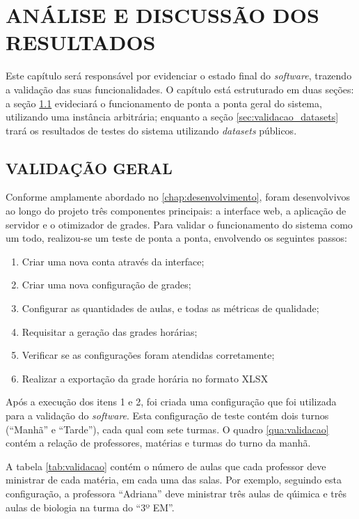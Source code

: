 
\chapter{ANÁLISE E DISCUSSÃO DOS RESULTADOS}
\label{chap:resultados}

Este capítulo será responsável por evidenciar o estado final do \textit{software}, trazendo a validação das suas funcionalidades. O capítulo está estruturado em duas seções: a seção \ref{sec:validacao_geral} evideciará o funcionamento de ponta a ponta geral do sistema, utilizando uma instância arbitrária; enquanto a seção \ref{sec:validacao_datasets} trará os resultados de testes do sistema utilizando \textit{datasets} públicos.

\section{VALIDAÇÃO GERAL}
\label{sec:validacao_geral}

Conforme amplamente abordado no \autoref{chap:desenvolvimento}, foram desenvolvivos ao longo do projeto três componentes principais: a interface web, a aplicação de servidor e o otimizador de grades. Para validar o funcionamento do sistema como um todo, realizou-se um teste de ponta a ponta, envolvendo os seguintes passos:

\begin{enumerate}
	\item Criar uma nova conta através da interface;
	\item Criar uma nova configuração de grades;
	\item Configurar as quantidades de aulas, e todas as métricas de qualidade;
	\item Requisitar a geração das grades horárias;
	\item Verificar se as configurações foram atendidas corretamente;
	\item Realizar a exportação da grade horária no formato XLSX
\end{enumerate}

Após a execução dos itens 1 e 2, foi criada uma configuração que foi utilizada para a validação do \textit{software}. Esta configuração de teste contém dois turnos (``Manhã'' e ``Tarde''), cada qual com sete turmas. O quadro \ref{qua:validacao} contém a relação de professores, matérias e turmas do turno da manhã. 

A tabela \ref{tab:validacao} contém o número de aulas que cada professor deve ministrar de cada matéria, em cada uma das salas. Por exemplo, seguindo esta configuração, a professora ``Adriana'' deve ministrar três aulas de qúimica e três aulas de biologia na turma do ``3º EM''.

